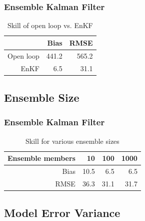 \documentclass[mathserif]{beamer}
\begin{document}
\begin{frame}
\begin{center}
\frametitle{Ensemble Kalman Filter}
\begin{table}
\begin{tabular}{rrr}
& Bias & RMSE \\
\hline
Open loop & 441.2 & 565.2 \\
EnKF & 6.5 & 31.1
\end{tabular}
\caption{Skill of open loop vs. EnKF}
\end{table}
\end{center}
\end{frame}

\subsection{Ensemble Size}

\begin{frame}
\begin{center}
\frametitle{Ensemble Kalman Filter}
\begin{table}
\begin{tabular}{rrrr}
Ensemble members & 10 & 100 & 1000 \\
\hline
Bias & 10.5 & 6.5 & 6.5 \\
RMSE & 36.3 & 31.1 & 31.7
\end{tabular}
\caption{Skill for various ensemble sizes}
\end{table}
\end{center}
\end{frame}

\subsection{Model Error Variance}

%
%
\end{document}
